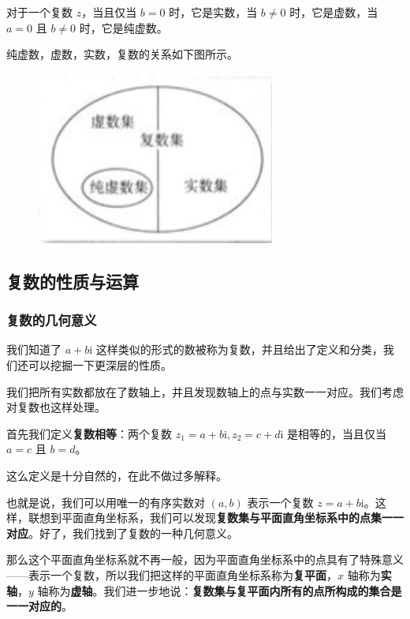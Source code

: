 对于一个复数 $z$，当且仅当 $b=0$ 时，它是实数，当 $b\not = 0$ 时，它是虚数，当 $a=0$ 且 $b\not = 0$ 时，它是纯虚数。

纯虚数，虚数，实数，复数的关系如下图所示。

\begin{figure}[htbp]
\centering
\includegraphics[width=0.7\textwidth]{docs/math/images/complex-1.png} 

\end{figure}



\subsection{复数的性质与运算}

\subsubsection{复数的几何意义}

我们知道了 $a+b\text{i}$ 这样类似的形式的数被称为复数，并且给出了定义和分类，我们还可以挖掘一下更深层的性质。

我们把所有实数都放在了数轴上，并且发现数轴上的点与实数一一对应。我们考虑对复数也这样处理。

首先我们定义\textbf{复数相等}：两个复数 $z_1=a+b\text{i},z_2=c+d\text{i}$ 是相等的，当且仅当 $a=c$ 且 $b=d$。

这么定义是十分自然的，在此不做过多解释。

也就是说，我们可以用唯一的有序实数对 $(a,b)$ 表示一个复数 $z=a+b\text{i}$。这样，联想到平面直角坐标系，我们可以发现\textbf{复数集与平面直角坐标系中的点集一一对应}。好了，我们找到了复数的一种几何意义。

那么这个平面直角坐标系就不再一般，因为平面直角坐标系中的点具有了特殊意义——表示一个复数，所以我们把这样的平面直角坐标系称为\textbf{复平面}，$x$ 轴称为\textbf{实轴}，$y$ 轴称为\textbf{虚轴}。我们进一步地说：\textbf{复数集与复平面内所有的点所构成的集合是一一对应的}。

